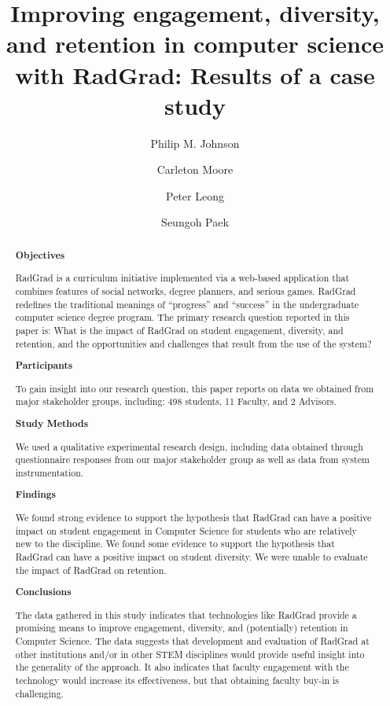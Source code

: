 \documentclass[acmsmall]{acmart}
\begin{document}
\title[RadGrad: Results of a case study]{Improving engagement, diversity, and retention in computer science with RadGrad: Results of a case study}

\author{Philip M. Johnson}
\author{Carleton Moore}

\author{Peter Leong}
\author{Seungoh Paek}

\renewcommand{\shortauthors}{Johnson et al.}

\newcommand{\AbstractCategory}[1]{%
  \par\addvspace{.5\baselineskip}%
  \noindent\textbf{#1}\quad\ignorespaces
}

\begin{abstract}

\AbstractCategory{Objectives}
RadGrad is a curriculum initiative implemented via a web-based application that combines features of social networks, degree planners, and serious games. RadGrad redefines the traditional meanings of ``progress'' and ``success'' in the undergraduate computer science degree program. The primary research question reported in this paper is: What is the impact of RadGrad on student engagement, diversity, and retention, and the opportunities and challenges that result from the use of the system?

\AbstractCategory{Participants}
To gain insight into our research question, this paper reports on data we obtained from major stakeholder groups, including: 498 students, 11 Faculty, and 2 Advisors.

\AbstractCategory{Study Methods}
We used a qualitative experimental research design, including data obtained through questionnaire responses from our major stakeholder group as well as data from system instrumentation.

\AbstractCategory{Findings}
We found strong evidence to support the hypothesis that RadGrad can have a positive impact on student engagement in Computer Science for students who are relatively new to the discipline. We found some evidence to support the hypothesis that RadGrad can have a positive impact on student diversity. We were unable to evaluate the impact of RadGrad on retention.

\AbstractCategory{Conclusions}
The data gathered in this study indicates that technologies like RadGrad provide a promising means to improve engagement, diversity, and (potentially) retention in Computer Science.  The data suggests that development and evaluation of RadGrad at other institutions and/or in other STEM disciplines would provide useful insight into the generality of the approach. It also indicates that faculty engagement with the technology would increase its effectiveness, but that obtaining faculty buy-in is challenging.

\end{abstract}
\end{document}
